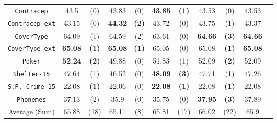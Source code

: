 \begin{table}
\begin{tabular}{c|cc|cc|cc|cc|cc}
{\tt Contracep}     &  43.5        & (0)          &  43.83       & (0)          &  {\bf 43.85} & {\bf (1)}        & 43.53      & (0)          & 43.53      &            \\
{\tt Contracep-ext} &  43.15       & (0)          &  {\bf 44.32} & {\bf (2)}    &  43.72       & (0)              & 43.75      & (1)          & 43.37      &            \\
{\tt CoverType}     &  64.09       & (1)          &  64.59       & (2)          &  63.61       & (0)              &{\bf 64.66} & {\bf (3)}    & {\bf 64.66}&            \\
{\tt CoverType-ext} &  {\bf 65.08} & {\bf (1)}    &  {\bf 65.08} & {\bf (1)}    &  65.05       & (0)              & 65.08      & {\bf (1)}    & {\bf 65.08}&            \\
{\tt Poker}         &  {\bf 52.24} & {\bf (2)}    &  49.88       & (0)          &  51.83       & (1)              & 52.09      & {\bf (2)}    & 52.09      &            \\
{\tt Shelter-15}    &  47.64       & (1)          &  46.52       & (0)          & {\bf 48.09}  & {\bf (3)}        & 47.71      & (1)          & 47.26      &            \\
{\tt S.F. Crime-15} &  22.08       & {\bf (1)}    &  22.06       & (0)          & {\bf 22.08}  & {\bf (1)}        & 22.08      & {\bf (1)}    & 22.08      &            \\
{\tt Phonemes}      &  37.13       & (2)          &  35.9        & (0)          & 35.75        & (0)              &{\bf 37.95} & {\bf (3)}    & 37.89      &            \\
\hline
Average (Sum)       &  65.88       & (18)         &  65.11       & (8)          & 65.81        & (17)             &  66.02     & (22)         & 65.9       &    
\end{tabular}
\normalsize
\label{tab:nominal-16}
\end{table}

